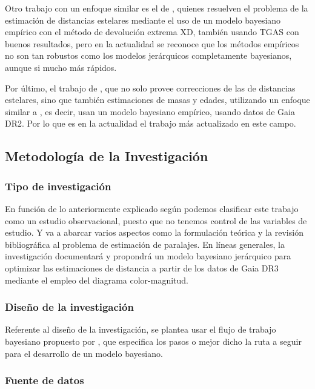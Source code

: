 \documentclass[stu, 12pt, letterpaper, donotrepeattitle, floatsintext, natbib]{apa7_ula}
\begin{document}
Otro trabajo con un enfoque similar es el de \citet{Anderson_2017}, quienes resuelven
el problema de la estimación de distancias estelares mediante el uso de un modelo
bayesiano empírico con el método de devolución extrema XD, también usando TGAS con buenos
resultados, pero en la actualidad se reconoce que los métodos empíricos no son tan
robustos como los modelos jerárquicos completamente bayesianos, aunque si mucho más
rápidos.

Por último, el trabajo de \citet{Zhang_2023}, que no solo provee correcciones de las
de distancias estelares, sino que también estimaciones de masas y edades,
utilizando un enfoque similar a \citet{Anderson_2017}, es decir, usan un
modelo bayesiano empírico, usando datos de Gaia DR2. Por lo que es
en la actualidad el trabajo más actualizado en este campo.

\subsection{Metodología de la Investigación}

\subsubsection{Tipo de investigación}

En función de lo anteriormente explicado según \citet{Cox_Donnelly_2011} podemos
clasificar este trabajo como un estudio observacional, puesto que no tenemos
control de las variables de estudio. Y va a abarcar
varios aspectos como la formulación teórica y la revisión bibliográfica al
problema de estimación de paralajes. En líneas generales, la investigación
documentará y propondrá un modelo bayesiano jerárquico para optimizar las
estimaciones de distancia a partir de los datos de Gaia DR3 mediante el
empleo del diagrama color-magnitud.

\subsubsection{Diseño de la investigación}

Referente al diseño de la investigación, se plantea usar el flujo de trabajo
bayesiano propuesto por \citet{gelman2020bayesian}, que especifica los pasos
o mejor dicho la ruta a seguir para el desarrollo de un modelo
bayesiano.

\subsubsection{Fuente de datos}
\end{document}
